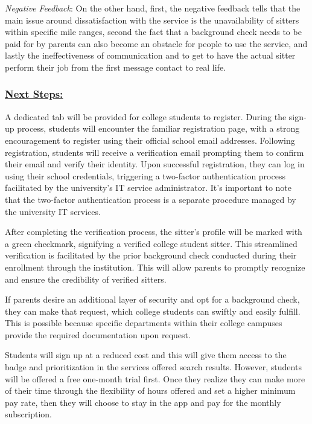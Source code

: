 \documentclass[12pt]{article}
\begin{document}
\emph{Negative Feedback}: On the other hand, first, the negative
feedback tells that the main issue around dissatisfaction with the
service is the unavailability of sitters within specific mile ranges,
second the fact that a background check needs to be paid for by parents
can also become an obstacle for people to use the service, and lastly
the ineffectiveness of communication and to get to have the actual
sitter perform their job from the first message contact to real life.

\hypertarget{next-steps}{%
\subsubsection{\texorpdfstring{\uline{\textbf{Next
Steps:}}}{Next Steps:}}\label{next-steps}}

A dedicated tab will be provided for college students to register.
During the sign-up process, students will encounter the familiar
registration page, with a strong encouragement to register using their
official school email addresses. Following registration, students will
receive a verification email prompting them to confirm their email and
verify their identity. Upon successful registration, they can log in
using their school credentials, triggering a two-factor authentication
process facilitated by the university's IT service administrator. It's
important to note that the two-factor authentication process is a
separate procedure managed by the university IT services.

After completing the verification process, the sitter's profile will be
marked with a green checkmark, signifying a verified college student
sitter. This streamlined verification is facilitated by the prior
background check conducted during their enrollment through the
institution. This will allow parents to promptly recognize and ensure
the credibility of verified sitters.

If parents desire an additional layer of security and opt for a
background check, they can make that request, which college students can
swiftly and easily fulfill. This is possible because specific
departments within their college campuses provide the required
documentation upon request.

Students will sign up at a reduced cost and this will give them access
to the badge and prioritization in the services offered search results.
However, students will be offered a free one-month trial first. Once
they realize they can make more of their time through the flexibility of
hours offered and set a higher minimum pay rate, then they will choose
to stay in the app and pay for the monthly subscription.~
\end{document}
